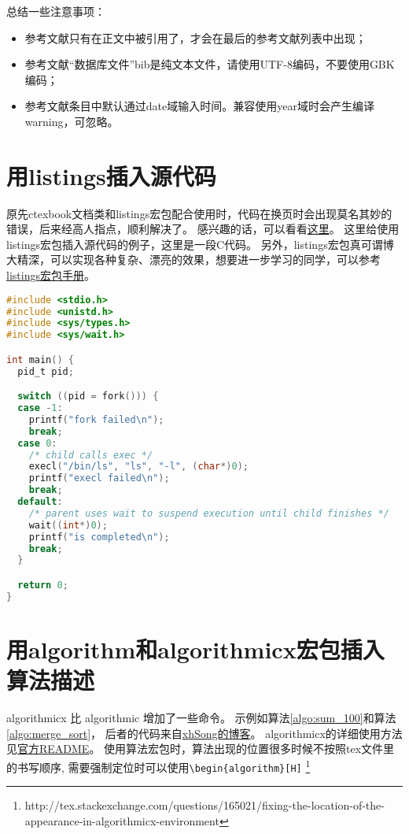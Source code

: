 总结一些注意事项：
\begin{itemize}
\item 参考文献只有在正文中被引用了，才会在最后的参考文献列表中出现；
\item 参考文献“数据库文件”bib是纯文本文件，请使用UTF-8编码，不要使用GBK编码；
\item 参考文献条目中默认通过date域输入时间。兼容使用year域时会产生编译warning，可忽略。
\end{itemize}

\section{用listings插入源代码}

原先ctexbook文档类和listings宏包配合使用时，代码在换页时会出现莫名其妙的错误，后来经高人指点，顺利解决了。
感兴趣的话，可以看看\href{http://bbs.ctex.org/viewthread.php?tid=53451}{这里}。
这里给使用listings宏包插入源代码的例子，这里是一段C代码。
另外，listings宏包真可谓博大精深，可以实现各种复杂、漂亮的效果，想要进一步学习的同学，可以参考
\href{http://mirror.ctan.org/macros/latex/contrib/listings/listings.pdf}{listings宏包手册}。

\begin{lstlisting}[language={C}, caption={一段C源代码}]
#include <stdio.h>
#include <unistd.h>
#include <sys/types.h>
#include <sys/wait.h>

int main() {
  pid_t pid;

  switch ((pid = fork())) {
  case -1:
    printf("fork failed\n");
    break;
  case 0:
    /* child calls exec */
    execl("/bin/ls", "ls", "-l", (char*)0);
    printf("execl failed\n");
    break;
  default:
    /* parent uses wait to suspend execution until child finishes */
    wait((int*)0);
    printf("is completed\n");
    break;
  }

  return 0;
}
\end{lstlisting}

\section{用algorithm和algorithmicx宏包插入算法描述}

algorithmicx 比 algorithmic 增加了一些命令。
示例如算法\ref{algo:sum_100}和算法\ref{algo:merge_sort}，
后者的代码来自\href{http://hustsxh.is-programmer.com/posts/38801.html}{xhSong的博客}。
algorithmicx的详细使用方法见\href{http://mirror.hust.edu.cn/CTAN/macros/latex/contrib/algorithmicx/algorithmicx.pdf}{官方README}。
使用算法宏包时，算法出现的位置很多时候不按照tex文件里的书写顺序, 
需要强制定位时可以使用\verb+\begin{algorithm}[H]+
\footnote{http://tex.stackexchange.com/questions/165021/fixing-the-location-of-the-appearance-in-algorithmicx-environment}

